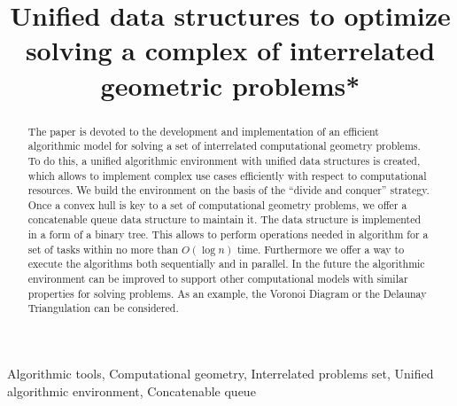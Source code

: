 \documentclass[conference]{IEEEtran}
\theoremstyle{plane}
\begin{document}
\title{Unified data structures to optimize solving a complex of interrelated geometric problems*\\
}
\author{
\and
{}
}
\maketitle

\begin{abstract}
		The paper is devoted to the development and implementation of an efficient algorithmic model for solving a set of interrelated computational geometry problems. To do this, a unified algorithmic environment with unified data structures is created, which allows to implement complex use cases efficiently with respect to computational resources. We build the environment on the basis of the ``divide and conquer'' strategy. 
		Once a convex hull is key to a set of computational geometry problems, we offer a concatenable queue data structure to maintain it. The data structure is implemented in a form of a binary tree. This allows to perform operations needed in algorithm for a set of tasks within no more than $O(\log n)$ time. Furthermore we offer a way to execute the algorithms both sequentially and in parallel.
		In the future the algorithmic environment can be improved to support other computational models with similar properties for solving problems. As an example, the Voronoi Diagram or the Delaunay Triangulation can be considered.
\end{abstract}

\begin{IEEEkeywords}
Algorithmic tools,   Computational geometry, Interrelated problems set, Unified algorithmic environment, Concatenable queue
\end{IEEEkeywords}
\end{document}
